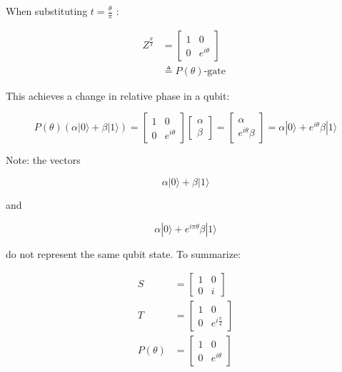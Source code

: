 \documentclass[main.tex]{subfiles}
\begin{document}
    When substituting $t=\frac{\theta}{\pi}$ :
    
    $$
    \begin{aligned}
    Z^{\frac{\theta}{\pi}} &=\left[\begin{array}{cc}
    1 & 0 \\
    0 & e^{i \theta}
    \end{array}\right] \\
    & \triangleq P(\theta) \text {-gate }
    \end{aligned}
    $$
    
    This achieves a change in relative phase in a qubit:
    
    $$
    P(\theta)(\alpha|0\rangle+\beta|1\rangle)=\left[\begin{array}{cc}
    1 & 0 \\
    0 & e^{i \theta}
    \end{array}\right]\left[\begin{array}{c}
    \alpha \\
    \beta
    \end{array}\right]=\left[\begin{array}{c}
    \alpha \\
    e^{i \theta} \beta
    \end{array}\right]=\alpha|0\rangle+e^{i \theta} \beta|1\rangle
    $$
    
    Note: the vectors
    
    $$
    \alpha|0\rangle+\beta|1\rangle
    $$
    
    and
    
    $$
    \alpha|0\rangle+e^{i \pi \theta} \beta|1\rangle
    $$
    
    do not represent the same qubit state. To summarize:
    
    $$
    \begin{aligned}
    S &=\left[\begin{array}{ll}
    1 & 0 \\
    0 & i
    \end{array}\right] \\
    T &=\left[\begin{array}{ll}
    1 & 0 \\
    0 & e^{i \frac{\pi}{4}}
    \end{array}\right] \\
    P(\theta) &=\left[\begin{array}{cc}
    1 & 0 \\
    0 & e^{i \theta}
    \end{array}\right]
    \end{aligned}
    $$
    
\end{document}
